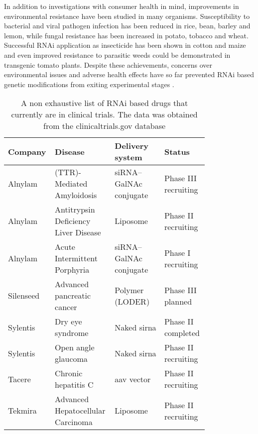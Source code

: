 In addition to investigations with consumer health in mind, improvements in environmental resistance have been studied in many organisms. Susceptibility to bacterial and viral pathogen infection has been reduced in rice, bean, barley and lemon, while fungal resistance has been increased in potato, tobacco and wheat. Successful RNAi application as insecticide has been shown in cotton and maize and even improved resistance to parasitic weeds could be demonstrated in transgenic tomato plants. Despite these achievements, concerns over environmental issues and adverse health effects have so far prevented RNAi based genetic modifications from exiting experimental stages \citep{Saurabh2014}.

\begin{table}
  \centering
  \caption[A selection of RNAi based drugs in clinical trials.]{A non exhaustive list of RNAi based drugs that currently are in clinical trials. The data was obtained from the clinicaltrials.gov database \cite{McCray2000}}
  \label{tab:rnai-clinical}
  \footnotesize
  \begin{tabular}{L{0.14\linewidth}L{0.24\linewidth}L{0.24\linewidth}L{0.18\linewidth}}
    Company &
      Disease &
      Delivery system &
      Status \\
    \hline 
    Alnylam &
      (TTR)-Mediated Amyloidosis &
      siRNA–GalNAc conjugate &
      Phase III recruiting \\
    Alnylam &
      Antitrypsin Deficiency Liver Disease &
      Liposome &
      Phase II recruiting \\
    Alnylam &
      Acute Intermittent Porphyria &
      siRNA–GalNAc conjugate &
      Phase I recruiting \\
    Silenseed &
      Advanced pancreatic cancer &
      Polymer (LODER) &
      Phase III planned \\
    Sylentis &
      Dry eye syndrome &
      Naked \gls{sirna} &
      Phase II completed \\
    Sylentis &
      Open angle glaucoma &
      Naked \gls{sirna} &
      Phase II recruiting \\
    Tacere &
      Chronic hepatitis C &
      \gls{aav} vector &
      Phase II recruiting \\
    Tekmira  &
      Advanced Hepatocellular Carcinoma &
      Liposome &
      Phase II recruiting \\
      \hline
  \end{tabular}
\end{table}

